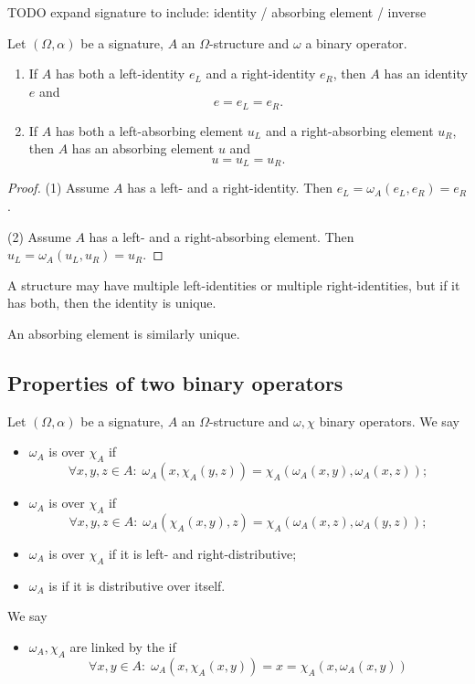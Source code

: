TODO expand signature to include: identity / absorbing element / inverse

\begin{lemma}
Let $(\Omega, \alpha)$ be a signature, $A$ an $\Omega$-structure and $\omega$ a binary operator.
\begin{enumerate}
\item If $A$ has both a left-identity $e_L$ and a right-identity $e_R$, then $A$ has an identity $e$ and
\[ e= e_L = e_R. \]
\item If $A$ has both a left-absorbing element $u_L$ and a right-absorbing element $u_R$, then $A$ has an absorbing element $u$ and
\[ u = u_L = u_R. \]
\end{enumerate}
\end{lemma}
\begin{proof}
(1) Assume $A$ has a left- and a right-identity. Then $e_L = \omega_A(e_L, e_R) = e_R$.

(2) Assume $A$ has a left- and a right-absorbing element. Then $u_L = \omega_A(u_L, u_R) = u_R$.
\end{proof}
\begin{corollary}
A structure may have multiple left-identities or multiple right-identities, but if it has both, then the identity is unique.

An absorbing element is similarly unique.
\end{corollary}

\subsection{Properties of two binary operators}
\begin{definition}
Let $(\Omega, \alpha)$ be a signature, $A$ an $\Omega$-structure and $\omega, \chi$ binary operators. We say
\begin{itemize}
\item $\omega_A$ is  over $\chi_A$ if
\[ \forall x,y,z\in A: \; \omega_A(x,\chi_A(y,z)) = \chi_A(\omega_A(x,y),\omega_A(x,z)); \]
\item $\omega_A$ is  over $\chi_A$ if
\[ \forall x,y,z\in A: \; \omega_A(\chi_A(x,y), z) = \chi_A(\omega_A(x,z),\omega_A(y,z)); \]
\item $\omega_A$ is  over $\chi_A$ if it is left- and right-distributive;
\item $\omega_A$ is  if it is distributive over itself.
\end{itemize}
We say
\begin{itemize}
\item $\omega_A, \chi_A$ are linked by the  if
\[ \forall x,y\in A:\; \omega_A(x,\chi_A(x,y)) = x = \chi_A(x,\omega_A(x,y)) \]
\end{itemize}
\end{definition}

